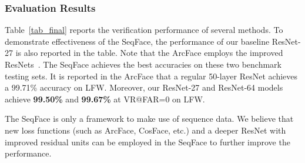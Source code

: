 \documentclass[conference]{acmsiggraph}
\begin{document}
\subsubsection{Evaluation Results}
Table~\ref{tab_final} reports the verification performance of several methods. To demonstrate effectiveness of the SeqFace, the performance of our baseline ResNet-27 is also reported in the table. Note that the ArcFace employs the improved ResNets~\cite{newresnet}. The SeqFace achieves the best accuracies on these two benchmark testing sets. It is reported in the ArcFace that a regular 50-layer ResNet achieves a 99.71\% accuracy on LFW. Moreover, our ResNet-27 and ResNet-64 models achieve \textbf{99.50\%} and \textbf{99.67\%} at VR@FAR=0 on LFW.

The SeqFace is only a framework to make use of sequence data. We believe that new loss functions (such as ArcFace, CosFace, etc.) and a deeper ResNet with improved residual units can be employed in the SeqFace to further improve the performance.  

\begin{table*}[t]
\caption{Verification accuracies(\%) of different methods on LFW and YTF. Note that ResNet models in the ArcFace used the improved residual units, and the training MS-Celeb-1M dataset used in the ArcFace contains 3.8M images and 85K identities.}
\centering
{}
\label{tab_final}
\end{table*}
\iffalse
\end{document}
